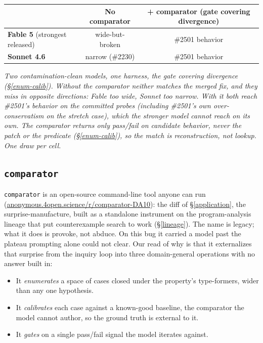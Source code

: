 \documentclass[
  10pt,
]{article}
\newcounter{none} %
\providecommand{\tightlist}{%
  \setlength{\itemsep}{0pt}\setlength{\parskip}{0pt}}
\begin{document}
{\def\LTcaptype{none} %
\begin{longtable}[]{@{}lcc@{}}
\toprule\noalign{}
& No comparator & + comparator (gate covering divergence) \\
\midrule\noalign{}
\endhead
\bottomrule\noalign{}
\endlastfoot
\textbf{Fable 5} (strongest released) & wide-but-broken & \#2501
behavior \\
\textbf{Sonnet 4.6} & narrow (\#2230) & \#2501 behavior \\
\end{longtable}
}

\emph{Two contamination-clean models, one harness, the gate covering
divergence (\S\ref{enum-calib}). Without the comparator neither matches
the merged fix, and they miss in opposite directions: Fable too wide,
Sonnet too narrow. With it both reach \#2501's behavior on the committed
probes (including \#2501's own over-conservatism on the stretch case),
which the stronger model cannot reach on its own. The comparator returns
only pass/fail on candidate behavior, never the patch or the predicate
(\S\ref{enum-calib}), so the match is reconstruction, not lookup. One
draw per cell.}

\subsection{\texorpdfstring{\texttt{comparator}}{comparator}}\label{gate-general}

\texttt{comparator} is an open-source command-line tool anyone can run
(\href{https://anonymous.4open.science/r/comparator-DA10}{anonymous.4open.science/r/comparator-DA10}):
the diff of \S\ref{application}, the surprise-manufacture, built as a
standalone instrument on the program-analysis lineage that put
counterexample search to work (\S\ref{lineage}). The name is legacy;
what it does is provoke, not abduce. On this bug it carried a model past
the plateau prompting alone could not clear. Our read of why is that it
externalizes that surprise from the inquiry loop into three
domain-general operations with no answer built in:

\begin{itemize}
\tightlist
\item
  It \emph{enumerates} a space of cases closed under the property's
  type-formers, wider than any one hypothesis.
\item
  It \emph{calibrates} each case against a known-good baseline, the
  comparator the model cannot author, so the ground truth is external to
  it.
\item
  It \emph{gates} on a single pass/fail signal the model iterates
  against.
\end{itemize}
\end{document}
